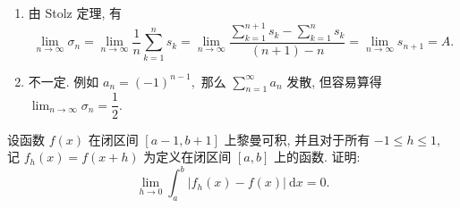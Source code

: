 \begin{solution}
\begin{enumerate}
\item 由 Stolz 定理, 有
\begin{equation*}
\lim_{n\to\infty} \sigma_n = \lim_{n\to\infty} \dfrac{1}{n} \sum_{k=1}^{n} s_k = \lim_{n\to\infty} \dfrac{\sum\limits_{k=1}^{n+1} s_k - \sum\limits_{k=1}^{n} s_k}{(n+1) - n} = \lim_{n\to\infty} s_{n+1} = A.
\end{equation*}
\item 不一定. 例如 $a_n = (-1)^{n-1},$ 那么 $\displaystyle \sum_{n=1}^{\infty} a_n$ 发散, 但容易算得 $\displaystyle \lim_{n\to\infty} \sigma_n = \dfrac{1}{2}.$
\end{enumerate}
\end{solution}

\begin{question}[points = 10]
设函数 $f(x)$ 在闭区间 $[a - 1, b + 1]$ 上黎曼可积, 并且对于所有 $-1 \leqslant h \leqslant 1,$ 记 $f_h(x) = f(x + h)$ 为定义在闭区间 $[a, b]$ 上的函数. 证明:
\[\lim_{h \to 0} \int_a^b |f_h(x) - f(x)| ~ \mathrm{d} x = 0.\]
\end{question}

